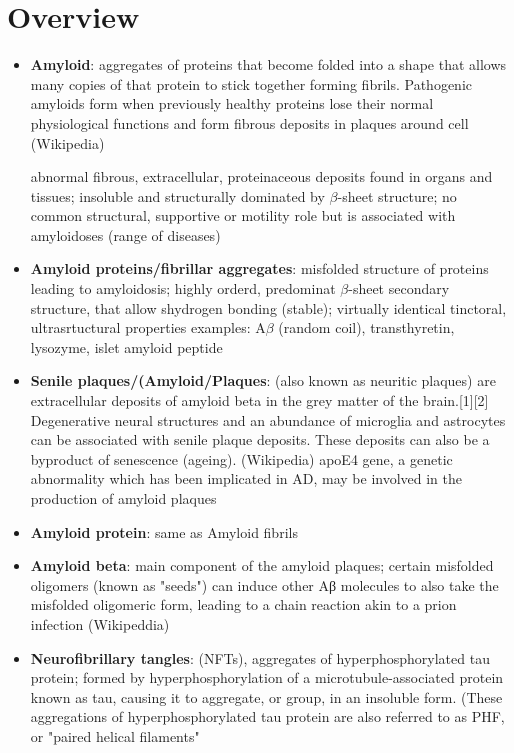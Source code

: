 \documentclass[fleqn]{article}\usepackage{caption}
\begin{document}
\section{Overview}
\begin{itemize}
\item \textbf{Amyloid}: 
aggregates of proteins that become folded into a shape that allows many copies of that protein to stick together forming fibrils. Pathogenic amyloids form when previously healthy proteins lose their normal physiological functions and form fibrous deposits in plaques around cell (Wikipedia)

abnormal fibrous, extracellular, proteinaceous deposits found in organs and tissues; insoluble and structurally dominated by $\beta$-sheet structure; no common structural, supportive or motility role but is associated with amyloidoses (range of diseases)%

\item \textbf{Amyloid proteins/fibrillar aggregates}: misfolded structure of proteins leading to amyloidosis; highly orderd, predominat $\beta$-sheet secondary structure, that allow shydrogen bonding (stable); virtually identical tinctoral, ultrasrtuctural properties examples: A$\beta$ (random coil), transthyretin, lysozyme, islet amyloid peptide  %

\item \textbf{Senile plaques/(Amyloid/Plaques}: (also known as neuritic plaques) are extracellular deposits of amyloid beta in the grey matter of the brain.[1][2] Degenerative neural structures and an abundance of microglia and astrocytes can be associated with senile plaque deposits. These deposits can also be a byproduct of senescence (ageing). (Wikipedia) 
apoE4 gene, a genetic abnormality which has been implicated in AD, may be involved in the production of amyloid plaques
\item \textbf{Amyloid protein}: same as Amyloid fibrils

\item \textbf{Amyloid beta}: main component of the amyloid plaques; certain misfolded oligomers (known as "seeds") can induce other Aβ molecules to also take the misfolded oligomeric form, leading to a chain reaction akin to a prion infection (Wikipeddia)


\item \textbf{Neurofibrillary tangles}: (NFTs),  aggregates of hyperphosphorylated tau protein;  formed by hyperphosphorylation of a microtubule-associated protein known as tau, causing it to aggregate, or group, in an insoluble form. (These aggregations of hyperphosphorylated tau protein are also referred to as PHF, or "paired helical filaments"


\end{itemize}
\end{document}
